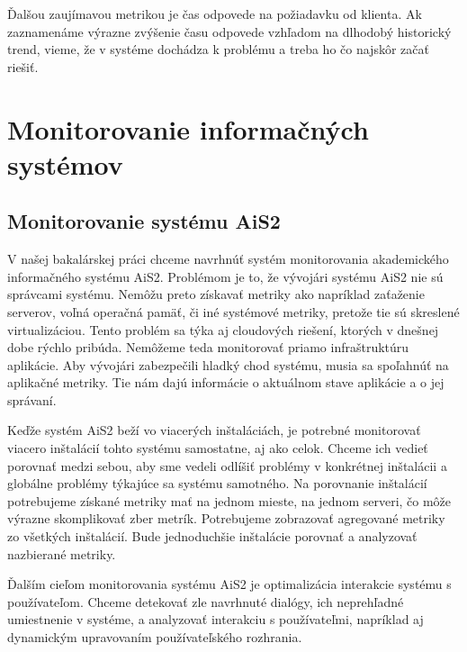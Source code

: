 \documentclass[a4paper, upjsfrontpage, disablespecwarning, thesismargins, thesislinespacing]{rnthesis}
\begin{document}
Ďalšou zaujímavou metrikou je čas odpovede na požiadavku od klienta.
Ak zaznamenáme výrazne zvýšenie času odpovede vzhľadom na dlhodobý historický trend, vieme, že v systéme dochádza k problému a treba ho čo najskôr začať riešiť.



\chapter{Monitorovanie informačných systémov}

\section{Monitorovanie systému AiS2}

V našej bakalárskej práci chceme navrhnúť systém monitorovania akademického informačného systému AiS2.
Problémom je to, že vývojári systému AiS2 nie sú správcami systému.
Nemôžu preto získavať metriky ako napríklad zaťaženie serverov, voľná operačná pamäť, či iné systémové metriky, pretože tie sú skreslené virtualizáciou.
Tento problém sa týka aj cloudových riešení, ktorých v dnešnej dobe rýchlo pribúda.
Nemôžeme teda monitorovať priamo infraštruktúru aplikácie.
Aby vývojári zabezpečili hladký chod systému, musia sa spoľahnúť na aplikačné metriky.
Tie nám dajú informácie o aktuálnom stave aplikácie a o jej správaní.

Keďže systém AiS2 beží vo viacerých inštaláciách, 
	je potrebné monitorovať viacero inštalácií tohto systému samostatne, aj ako celok.
Chceme ich vedieť porovnať medzi sebou, 
	aby sme vedeli odlíšiť problémy v konkrétnej inštalácii a globálne problémy týkajúce sa systému samotného.
Na porovnanie inštalácií potrebujeme získané metriky mať na jednom mieste, na jednom serveri, čo môže výrazne skomplikovať zber metrík.
Potrebujeme zobrazovať agregované metriky zo všetkých inštalácií.
Bude jednoduchšie inštalácie porovnať a analyzovať nazbierané metriky.

Ďalším cieľom monitorovania systému AiS2 je optimalizácia interakcie systému s používateľom.
Chceme detekovať zle navrhnuté dialógy, ich neprehľadné umiestnenie v systéme, a analyzovať interakciu s používateľmi, napríklad aj dynamickým upravovaním používateľského rozhrania.
\end{document}
